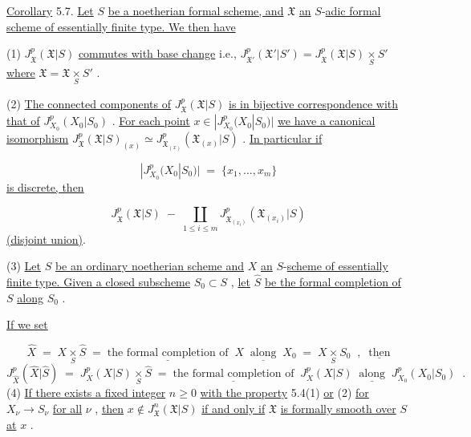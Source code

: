 \underline{Corollary} 5.7. \underline{Let} $S$ \underline{be a noetherian formal scheme, and} $\mathfrak{X}$ \underline{an} $S$-\underline{adic formal scheme of essentially finite type. We then have}

(1) $J^p_{\mathfrak{X}}(\mathfrak{X}|S)$ \underline{commutes with base change} i.e., $J^p_{\mathfrak{X}'}(\mathfrak{X}'|S') = J^p_{\mathfrak{X}}(\mathfrak{X}|S) \underset{S}{\times} S'$ \underline{where} $\mathfrak{X} = \mathfrak{X} \underset{S}{\times} S'$ .

(2) \underline{The connected components of} $J^p_{\mathfrak{X}}(\mathfrak{X}|S)$ \underline{is in bijective correspondence with that of} $J^p_{X_0}(X_0|S_0)$ . \underline{For each point} $x \in |J^p_{X_0}(X_0|S_0)|$ \underline{we have a canonical isomorphism} $J^p_{\mathfrak{X}}(\mathfrak{X}|S)_{(x)} \simeq J^p_{\mathfrak{X}_{(x)}}(\mathfrak{X}_{(x)}|S)$ . \underline{In particular if}

\begin{equation*}
|J^p_{X_0}(X_0|S_0)| \;=\; \{x_1,\dots,x_m\}
\end{equation*}
\underline{is discrete, then}

\begin{equation*}
J^p_{\mathfrak{X}}(\mathfrak{X}|S) \;-\; \coprod_{1 \leq i \leq m} J^p_{\mathfrak{X}_{(x_i)}}(\mathfrak{X}_{(x_i)}|S)
\end{equation*}
\underline{(disjoint union)}.



(3) \underline{Let} $S$ \underline{be an ordinary noetherian scheme and} $X$ \underline{an} $S$-\underline{scheme of essentially finite type. Given a closed subscheme} $S_0 \subset S$ , \underline{let} $\widehat{S}$ \underline{be the formal completion of} $S$ \underline{along} $S_0$ .

\underline{If we set}

\begin{equation*}
\widehat{X} \;=\; X \underset{S}{\times} \widehat{S} \;=\; \underline{\text{the formal completion of}}\;\; X \;\; \underline{\text{along}} \;\; X_0 \;=\; X \underset{S}{\times} S_0 \;\;,\;\; \underline{\text{then}}
\end{equation*}
\begin{equation*}
J^{p}_{\widehat{X}}(\widehat{X}|\widehat{S}) \;=\; J^{p}_{X}(X|S) \underset{S}{\times} \widehat{S} \;=\; \underline{\text{the formal completion of}} \;\; J^{p}_{X}(X|S) \;\; \underline{\text{along}} \;\; J^{p}_{X_0}(X_0|S_0) \;\;.
\end{equation*}
(4) \underline{If there exists a fixed integer} $n \geq 0$ \underline{with the property} 5.4(1) \underline{or} (2) \underline{for} $X_\nu \to S_\nu$ \underline{for all} $\nu$ , \underline{then} $x \notin J^{n}_{\mathfrak{X}}(\mathfrak{X}|S)$ \underline{if and only if} $\mathfrak{X}$ \underline{is formally smooth over} $S$ \underline{at} $x$ .

